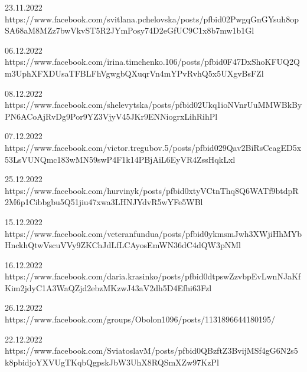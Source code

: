  
 
 
 
 


23.11.2022
https://www.facebook.com/svitlana.pchelovska/posts/pfbid02PwgqGnGYsuh8opSA68aM8MZz7bwVkvST5R2JYmPosy74D2eGfUC9C1x8b7mw1b1Gl

06.12.2022
https://www.facebook.com/irina.timchenko.106/posts/pfbid0F47DxShoKFUQ2Qm3UphXFXDUsaTFBLFhVgwgbQXuqrVn4mYPvRvhQ5x5UXgvBsFZl

08.12.2022
https://www.facebook.com/shelevytska/posts/pfbid02Ukq1ioNVnrUuMMWBkByPN6ACoAjRvDg9Por9YZ3VjyV45JKr9ENNiogrxLihRihPl

07.12.2022
https://www.facebook.com/victor.tregubov.5/posts/pfbid029Qav2BiRsCeagED5x53LsVUNQmc183wMN59swP4F1k14PBjAiL6EyVR4ZssHqkLxl

25.12.2022
https://www.facebook.com/hurvinyk/posts/pfbid0xtyVCtnThq8Q6WATf9btdpR2M6p1Cibbgbu5Q51jiu47xwa3LHNJYdvR5wYFe5WBl

15.12.2022
https://www.facebook.com/veteranfundua/posts/pfbid0ykmsmJwh3XWjiHhMYbHnckhQtwVscuVVy9ZKChJdLfLCAyosEmWN36dC4dQW3pNMl

16.12.2022
https://www.facebook.com/daria.krasinko/posts/pfbid0dtpswZzvbpEvLwnNJaKfKim2jdyC1A3WaQZjd2ebzMKzwJ43aV2dh5D4Efhi63Fzl

26.12.2022
https://www.facebook.com/groups/Obolon1096/posts/1131896644180195/

22.12.2022
https://www.facebook.com/SviatoslavM/posts/pfbid0QBzftZ3BvijMSf4gG6N2s5k8pbidjoYXVUgTKqbQgpskJbW3UhX8RQSmXZw97KzPl

